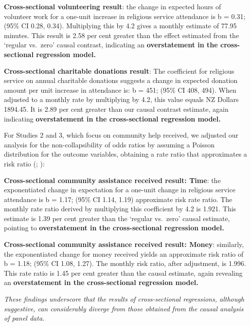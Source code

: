 \documentclass[
  single column]{article}
\begin{document}
\textbf{Cross-sectional volunteering result}: the change in expected
hours of volunteer work for a one-unit increase in religious service
attendance is b = 0.31; (95\% CI 0.28, 0.34). Multiplying this by 4.2
gives a monthly estimate of 77.95 minutes. This result is 2.58 per cent
greater than the effect estimated from the `regular vs.~zero' causal
contrast, indicating an \textbf{overstatement in the cross-sectional
regression model.}

\textbf{Cross-sectional charitable donations result}: The coefficient
for religious service on annual charitable donations suggests a change
in expected donation amount per unit increase in attendance is: b = 451;
(95\% CI 408, 494). When adjusted to a monthly rate by multiplying by
4.2, this value equals NZ Dollars 1894.45. It is 2.89 per cent greater
than our causal contrast estimate, again indicating
\textbf{overstatement in the cross-sectional regression model.}

For Studies 2 and 3, which focus on community help received, we adjusted
our analysis for the non-collapsibility of odds ratios by assuming a
Poisson distribution for the outcome variables, obtaining a rate ratio
that approximates a risk ratio
(; ):

\textbf{Cross-sectional community assistance received result: Time}: the
exponentiated change in expectation for a one-unit change in religious
service attendance is b = 1.17; (95\% CI 1.14, 1.19) approximate risk
rate ratio. The monthly rate ratio derived by multiplying this
coefficient by 4.2 is 1.921. This estimate is 1.39 per cent greater than
the `regular vs.~zero' causal estimate, pointing to
\textbf{overstatement in the cross-sectional regression model.}

\textbf{Cross-sectional community assistance received result: Money}:
similarly, the exponentiated change for money received yields an
approximate risk ratio of b = 1.18; (95\% CI 1.08, 1.27). The monthly
risk ratio, after adjustment, is 1.996. This rate ratio is 1.45 per cent
greater than the causal estimate, again revealing an
\textbf{overstatement in the cross-sectional regression model.}

\emph{These findings underscore that the results of cross-sectional
regressions, although suggestive, can considerably diverge from those
obtained from the causal analysis of panel data.}

\newpage{}
\end{document}

